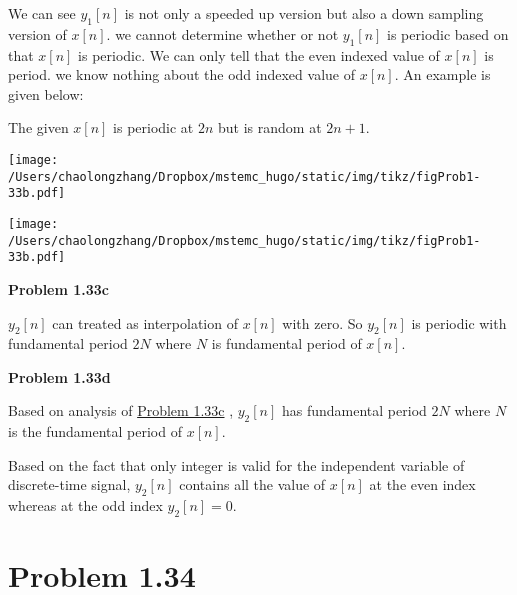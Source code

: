 \documentclass[koma,a4paper,utopia,12pt,listings-color,microtype,paralist,colorlinks,urlcolor=red]{org-article}
\begin{document}
We can see \(y_{1}[n]\) is not only a speeded up version but also a down
sampling version of \(x[n]\). we cannot determine whether or not \(y_{1}[n]\)
is periodic based on that \(x[n]\) is periodic. We can only tell that the even
indexed value of \(x[n]\) is period. we know nothing about the odd indexed value
of \(x[n]\). An example is given below:

The given \(x[n]\) is periodic at \(2n\) but is random at \(2n+1\).
\begin{center}
\texttt{[image: /Users/chaolongzhang/Dropbox/mstemc\_hugo/static/img/tikz/figProb1-33b.pdf]}
\end{center}


\begin{center}
\texttt{[image: /Users/chaolongzhang/Dropbox/mstemc\_hugo/static/img/tikz/figProb1-33b.pdf]}
\end{center}

\textbf{Problem 1.33c} \label{Problem 1.33c}

\(y_{2}[n]\) can treated as interpolation of \(x[n]\) with zero. So \(y_{2}[n]\)
is periodic with fundamental period \(2N\) where \(N\) is fundamental period of
\(x[n]\).

\textbf{Problem 1.33d}

Based on analysis of \hyperref[Problem 1.33c]{Problem 1.33c} , \(y_{2}[n]\) has fundamental period \(2N\)
where \(N\) is the fundamental period of \(x[n]\).

Based on the fact that only integer is valid for the independent variable of
discrete-time signal, \(y_{2}[n]\) contains all the value of \(x[n]\) at the
even index whereas at the odd index \(y_{2}[n]= 0\).
\section{Problem 1.34}
\label{sec:org4fc36d2}
\end{document}
